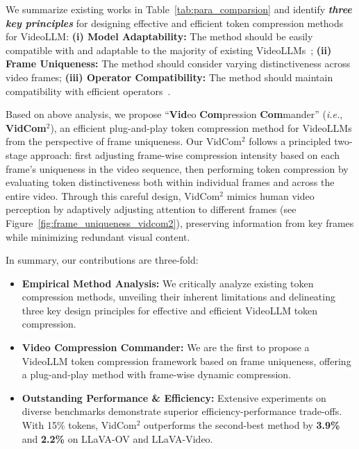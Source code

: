 We summarize existing works in Table~\ref{tab:para_comparsion} and identify \textbf{\emph{three key principles}} for designing effective and efficient token compression methods for VideoLLM:
\textbf{(i) Model Adaptability:} The method should be easily compatible with and adaptable to the majority of existing VideoLLMs~\cite{zhang2024llava-video,Wang:Qwen2-VL}; \textbf{(ii) Frame Uniqueness:} The method should consider varying distinctiveness across video frames;
\textbf{(iii) Operator Compatibility:} The method should maintain compatibility with efficient operators~\cite{daoFlashAttention-2}.


Based on above analysis, we propose ``\textbf{Vid}eo \textbf{Com}pression \textbf{Com}mander'' (\textit{i.e.}, \textbf{VidCom$^2$}), an efficient plug-and-play token compression method for VideoLLMs from the perspective of frame uniqueness. Our VidCom$^2$ follows a principled two-stage approach: first adjusting frame-wise compression intensity based on each frame's uniqueness in the video sequence, then performing token compression by evaluating token distinctiveness both within individual frames and across the entire video. Through this careful design, VidCom$^2$ mimics human video perception by adaptively adjusting attention to different frames (see Figure~\ref{fig:frame_uniqueness_vidcom2}), preserving information from key frames while minimizing redundant visual content.


In summary, our contributions are three-fold:
\begin{itemize}

    \item \textbf{Empirical Method Analysis:} We critically analyze existing token compression methods, unveiling their inherent limitations and delineating three key design principles for effective and efficient VideoLLM token compression.
    
    \item \textbf{Video Compression Commander:} We are the first to propose a VideoLLM token compression framework based on frame uniqueness, offering a plug-and-play method with frame-wise dynamic compression.
    
    \item \textbf{Outstanding Performance \& Efficiency:} Extensive experiments on diverse benchmarks demonstrate superior efficiency-performance trade-offs. With 15\% tokens, VidCom$^2$ outperforms the second-best method by \textbf{3.9\%} and \textbf{2.2\%} on LLaVA-OV and LLaVA-Video.

    
\end{itemize}
